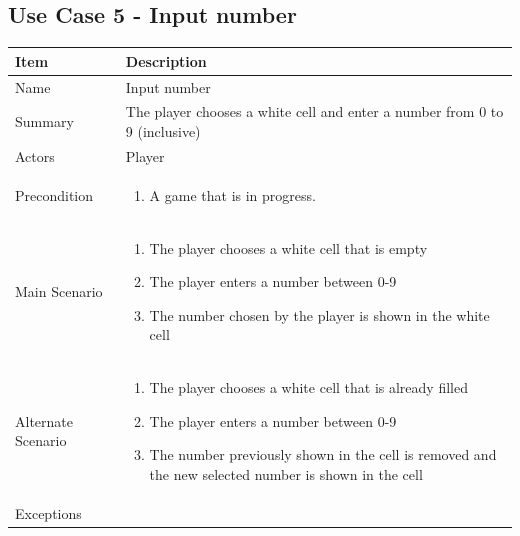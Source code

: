 \documentclass[12pt]{article}
\begin{document}
\newpage


\subsection{Use Case 5 - Input number}

\begin{center}
\setlength{\tabcolsep}{18pt}
\renewcommand{\arraystretch}{1.3}
\begin{tabular}{ |p{3.4cm}|p{10cm}| }
    \hline
    \textbf{Item} & \textbf{Description} \\
    \hline
    Name & Input number \\
    \hline
    Summary & The player chooses a white cell and enter a number from 0 to 9 (inclusive) \\
    \hline
    Actors & Player \\
    \hline
    Precondition & 
    \vspace*{-0.1in}
    \begin{enumerate}[leftmargin=0.2in]
        \item A game that is in progress.
    \end{enumerate}  \\
    \hline
    Main Scenario &     
    \vspace*{-0.1in}
    \begin{enumerate}[leftmargin=0.2in]
        \item The player chooses a white cell that is empty
        \item The player enters a number between 0-9
        \item The number chosen by the player is shown in the white cell
    \end{enumerate}  \\
    \hline
    Alternate Scenario &     
    \vspace*{-0.1in}
    \begin{enumerate}[leftmargin=0.2in]
        \item The player chooses a white cell that is already filled
        \item The player enters a number between 0-9
        \item The number previously shown in the cell is removed and the new selected number is shown in the cell
    \end{enumerate}  \\
    \hline
    Exceptions & 
    \vspace*{-0.1in}

\end{tabular}
\end{center}
\end{document}
